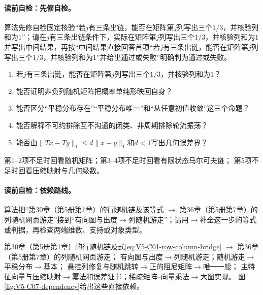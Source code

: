 \label{struct:V5-C07-CH03}
\paragraph{读前自检：先修自检。}\PageRank{} 算法先修自检固定核验“若$j$有三条出链，能否在矩阵第$j$列写出三个$1/3$，并核验列和为$1$”；请在$j$有三条出链条件下，实际在矩阵第$j$列写出三个$1/3$，并核验列和为$1$并写出中间结果，再按“中间结果直接回答首项“若$j$有三条出链，能否在矩阵第$j$列写出三个$1/3$，并核验列和为$1$”并给出通过或失败”明确判为通过或失败。\par

\begin{precheckbox}
\begin{enumerate}[leftmargin=2.2em]
  \item 若$j$有三条出链，能否在矩阵第$j$列写出三个$1/3$，并核验列和为$1$？
  \item 能否证明非负列随机矩阵把概率单纯形映回自身？
  \item 能否区分“平稳分布存在”“平稳分布唯一”和“从任意初值收敛”这三个命题？
  \item 能否解释不可约排除互不沟通的闭类、非周期排除轮流振荡？
  \item 能否由$\|Tx-Ty\|_1\le d\|x-y\|_1$和$d<1$写出几何误差界？
\end{enumerate}
第1--2项不足时回看随机矩阵；第3--4项不足时回看有限状态马尔可夫链；
第5项不足时回看压缩映射与几何级数。
\end{precheckbox}

\label{struct:V5-C07-CH04}
\paragraph{读前自检：依赖路线。}\PageRank{} 算法把“第30章（第5册第1章）的行随机链及该等式 $\to$ 第36章（第5册第7章）的列随机网页游走”接到“有向图与出度$\to$列随机游走”；请用$\to$补全这一步的等式或判据，再检查两端维数、支持或对象类型。\par

\begin{dependencybox}
第30章（第5册第1章）的行随机链及式\eqref{eq:V5-C01-row-column-bridge} $\to$ 第36章（第5册第7章）的列随机网页游走；
有向图与出度$\to$列随机游走；随机游走$\to$平稳分布$\to$基本\PageRank{}；
悬挂列修复与随机跳转$\to$正的阻尼矩阵$\to$唯一一般\PageRank{}；
主特征向量与压缩映射$\to$幂法和误差证书；稀疏矩阵--向量乘法$\to$大图实现。
图\ref{fig:V5-C07-dependency}给出这些直接依赖。
\end{dependencybox}


